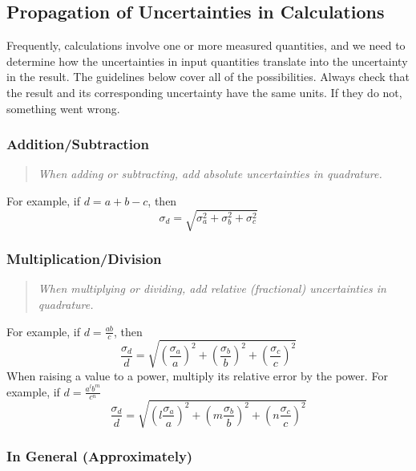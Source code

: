 \documentclass[12pt]{article}
\begin{document}
\subsection*{Propagation of Uncertainties in Calculations}

Frequently, calculations involve one or more measured quantities, and we
need to determine how the uncertainties in input quantities translate
into the uncertainty in the result. The guidelines below cover all
of the possibilities. Always check that the result and its
corresponding uncertainty have the same units. If they do not,
something went wrong.

\subsubsection*{Addition/Subtraction}

\begin{quote}
\textit{When adding or subtracting, add absolute uncertainties in
quadrature.}
\end{quote}

For example, if $d = a+b-c$, then 
\begin{equation}
\sigma_d = \sqrt{\sigma_a^2+\sigma_b^2+\sigma_c^2}
\end{equation}

\subsubsection*{Multiplication/Division}

\begin{quote}
\textit{When multiplying or dividing, add relative (fractional)
uncertainties in quadrature.}
\end{quote}

For example, if $d = \frac{ab}{c}$, then
\begin{equation}
\frac{\sigma_d}{d} = \sqrt{
\left( \frac{\sigma_a}{a} \right)^2
+\left( \frac{\sigma_b}{b} \right)^2
+\left( \frac{\sigma_c}{c} \right)^2
}
\end{equation}
When raising a value to a power, multiply its relative error by the
power. For example, if $d = \frac{a^lb^m}{c^n}$
\begin{equation}
\frac{\sigma_d}{d} = \sqrt{
\left(l \frac{\sigma_a}{a} \right)^2
+\left(m \frac{\sigma_b}{b} \right)^2
+\left(n \frac{\sigma_c}{c} \right)^2
}
\end{equation}

\subsubsection*{In General (Approximately)}
\end{document}
